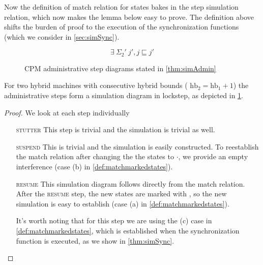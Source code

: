 Now the definition of match relation for  states bakes in the step simulation relation, which now makes the lemma below easy to prove. The definition above shifts the burden of proof to the execution of the synchronization functions (which we consider in \cref{sec:simSync}).

 \begin{figure}\centering
 
$$\exists\ \Sigma_2'\ j', j \sqsubseteq j' $$

\caption[CPM administrative step diagrams]{CPM administrative step diagrams stated in \cref{thm:simAdmin}}\label{figure:admitstepdiag}
\end{figure}

\begin{lemma}\label{thm:simAdmin}
For two hybrid machines with consecutive hybrid bounds ( $\text{hb}_2 = \text{hb}_1 +1$) the administrative steps form a simulation diagram in lockstep, as depicted in \cref{figure:admitstepdiag}.
%   
\end{lemma}

\begin{proof}
We look at each step individually
\begin{enumerate}[r]
\item[\textsc{stutter}] This step is trivial and the simulation is trivial as well. 
\item[\textsc{suspend}] This is trivial and the simulation is easily constructed. To reestablish the match relation after changing the the states to  $\cdot$, we provide an empty interference (case (b) in \cref{def:matchmarkedstates}). 
\item[\textsc{resume}] This simulation diagram follows directly from the match relation. After the \textsc{resume} step, the new states are marked with , so the new simulation is easy to establish (case (a) in \cref{def:matchmarkedstates}). 

It's worth noting that for this step we are using the (c) case in \cref{def:matchmarkedstates}, which is established when the synchronization function is executed, as we show in \cref{thm:simSync}. \qedhere
\end{enumerate}
\end{proof}
